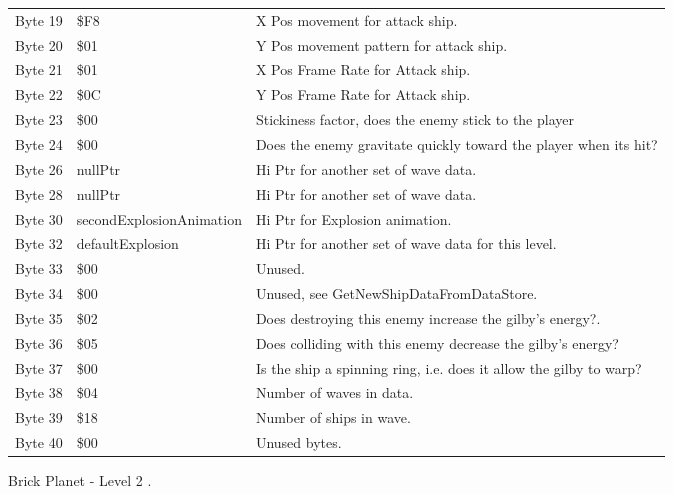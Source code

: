 \begin{figure}[H]
{\begin{adjustbox}{width=12cm}
\begin{tabular}{lll}
 Byte 19 & \$F8                       & X Pos movement for attack ship.                                    \\
 Byte 20 & \$01                       & Y Pos movement pattern for attack ship.                            \\
 Byte 21 & \$01                       & X Pos Frame Rate for Attack ship.                                  \\
 Byte 22 & \$0C                       & Y Pos Frame Rate for Attack ship.                                  \\
 Byte 23 & \$00                       & Stickiness factor, does the enemy stick to the player              \\
 Byte 24 & \$00                       & Does the enemy gravitate quickly toward the player when its hit?   \\
 Byte 26 & nullPtr                   & Hi Ptr for another set of wave data.                               \\
 Byte 28 & nullPtr                   & Hi Ptr for another set of wave data.                               \\
 Byte 30 & secondExplosionAnimation  & Hi Ptr for Explosion animation.                                    \\
 Byte 32 & defaultExplosion          & Hi Ptr for another set of wave data for this level.                \\
 Byte 33 & \$00                       & Unused.                                                            \\
 Byte 34 & \$00                       & Unused, see GetNewShipDataFromDataStore.                           \\
 Byte 35 & \$02                       & Does destroying this enemy increase the gilby's energy?.           \\
 Byte 36 & \$05                       & Does colliding with this enemy decrease the gilby's energy?        \\
 Byte 37 & \$00                       & Is the ship a spinning ring, i.e. does it allow the gilby to warp? \\
 Byte 38 & \$04                       & Number of waves in data.                                           \\
 Byte 39 & \$18                       & Number of ships in wave.                                           \\
 Byte 40 & \$00                       & Unused bytes.                                                      \\
\bottomrule
\end{tabular}

  \end{adjustbox}

  }\caption*{Brick Planet - Level 2
.}
\end{figure}

